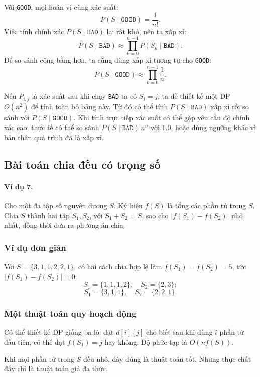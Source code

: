 \documentclass[11pt]{article}
\begin{document}
Với \texttt{GOOD}, mọi hoán vị cùng xác suất:
\[
  P(S\mid\texttt{GOOD})=\frac1{n!}.
\]
Việc tính chính xác \(P(S\mid\texttt{BAD})\) lại rất khó, nên ta xấp xỉ:
\[
  P(S\mid\texttt{BAD})\approx
  \prod_{k=0}^{n-1}P(S_k\mid\texttt{BAD}).
\]
Để so sánh công bằng hơn, ta cũng dùng xấp xỉ tương tự cho \texttt{GOOD}:
\[
  P(S\mid\texttt{GOOD})\approx \prod_{k=0}^{n-1}\frac1n.
\]

Nếu \(P_{i,j}\) là xác suất sau khi chạy \texttt{BAD} ta có \(S_i=j\), ta dễ
thiết kế một DP \(O(n^2)\) để tính toàn bộ bảng này. Từ đó có thể tính
\(P(S\mid\texttt{BAD})\) xấp xỉ rồi so sánh với
\(P(S\mid\texttt{GOOD})\). Khi tính trực tiếp xác suất có thể gặp yêu cầu độ
chính xác cao; thực tế có thể so sánh \(P(S\mid\texttt{BAD})\,n^n\) với \(1.0\),
hoặc dùng ngưỡng khác vì bản thân quá trình đã là xấp xỉ.

\subsection{Bài toán chia đều có trọng số}

\paragraph{Ví dụ 7.}
Cho một đa tập số nguyên dương \(S\). Ký hiệu \(f(S)\) là tổng các phần tử trong
\(S\). Chia \(S\) thành hai tập \(S_1,S_2\), với \(S_1+S_2=S\), sao cho
\(|f(S_1)-f(S_2)|\) nhỏ nhất, đồng thời đưa ra phương án chia.

\subsubsection{Ví dụ đơn giản}

Với \(S=\{3,1,1,2,2,1\}\), có hai cách chia hợp lệ làm
\(f(S_1)=f(S_2)=5\), tức \(|f(S_1)-f(S_2)|=0\):
\[
  S_1=\{1,1,1,2\},\quad S_2=\{2,3\};
\]
\[
  S_1=\{3,1,1\},\quad S_2=\{2,2,1\}.
\]

\subsubsection{Một thuật toán quy hoạch động}

Có thể thiết kế DP giống ba lô: đặt \(d[i][j]\) cho biết sau khi dùng \(i\) phần
tử đầu tiên, có thể đạt \(f(S_1)=j\) hay không. Độ phức tạp là
\(O(nf(S))\).

Khi mọi phần tử trong \(S\) đều nhỏ, đây đúng là thuật toán tốt. Nhưng thực chất
đây chỉ là thuật toán giả đa thức.
\end{document}
